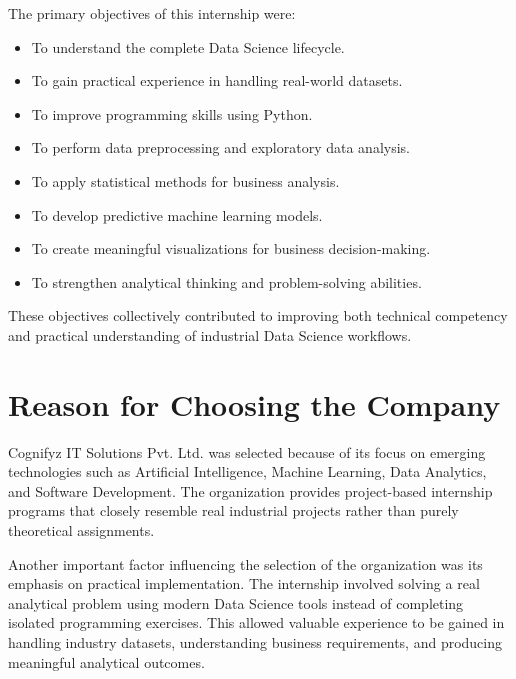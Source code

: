 \documentclass[12pt,a4paper]{report}
\begin{document}
The primary objectives of this internship were:

\begin{itemize}

\item To understand the complete Data Science lifecycle.

\item To gain practical experience in handling real-world datasets.

\item To improve programming skills using Python.

\item To perform data preprocessing and exploratory data analysis.

\item To apply statistical methods for business analysis.

\item To develop predictive machine learning models.

\item To create meaningful visualizations for business decision-making.

\item To strengthen analytical thinking and problem-solving abilities.

\end{itemize}

These objectives collectively contributed to improving both technical competency and practical understanding of industrial Data Science workflows.


\section{Reason for Choosing the Company}

Cognifyz IT Solutions Pvt. Ltd. was selected because of its focus on emerging technologies such as Artificial Intelligence, Machine Learning, Data Analytics, and Software Development. The organization provides project-based internship programs that closely resemble real industrial projects rather than purely theoretical assignments.

Another important factor influencing the selection of the organization was its emphasis on practical implementation. The internship involved solving a real analytical problem using modern Data Science tools instead of completing isolated programming exercises. This allowed valuable experience to be gained in handling industry datasets, understanding business requirements, and producing meaningful analytical outcomes.
\end{document}
